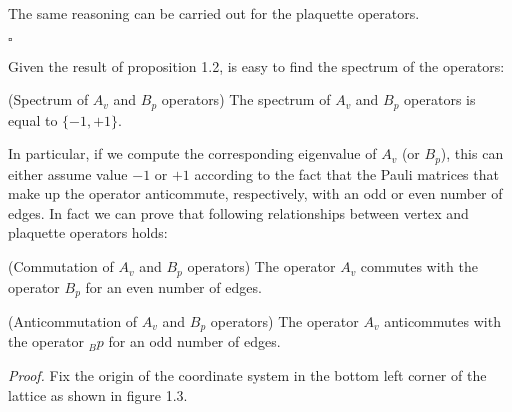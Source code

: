 \documentclass{Configuration_Files/PoliMi3i_thesis}
\begin{document}
The same reasoning can be carried out for the plaquette operators.

\hfill $\square$ 

Given the result of proposition 1.2, is easy to find the spectrum of the operators: 

\begin{proposition} (Spectrum of $A_v$ and $B_p$ operators) The spectrum of $A_v$ and $B_p$ operators is equal to $\{-1,+1\}$. 
\end{proposition}

In particular, if we compute the corresponding eigenvalue of $A_v$ (or $B_p$), this can either assume value $-1$ or $+1$ according to the fact that the Pauli matrices that make up the operator anticommute, respectively, with an odd or even number of edges.
In fact we can prove that following relationships between vertex and plaquette operators holds:

\begin{proposition} (Commutation of $A_v$ and $B_p$ operators) The operator $A_v$ commutes with the operator $B_p$ for an even number of edges.
\end{proposition}


\begin{proposition} (Anticommutation of $A_v$ and $B_p$ operators) The operator $A_v$ anticommutes with the operator $_Bp$ for an odd number of edges.
\end{proposition}


\textit{Proof.}\newline 
Fix the origin of the coordinate system in the bottom left corner of the lattice as shown in figure 1.3. 
\end{document}
